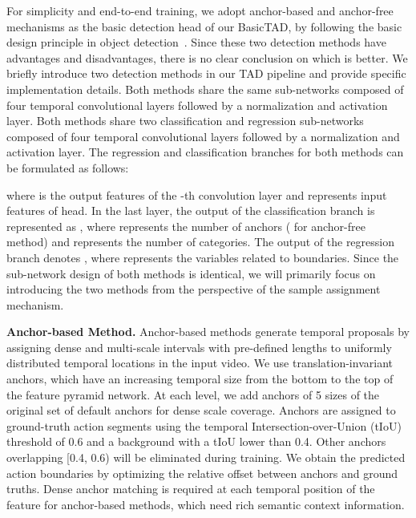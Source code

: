 \documentclass[a4paper,fleqn]{cas-dc}
\begin{document}
For simplicity and end-to-end training, we adopt anchor-based and anchor-free mechanisms as the basic detection head of our BasicTAD, by following the basic design principle in object detection~\citep{faster-rcnn,retina,fcos}.
Since these two detection methods have advantages and disadvantages, there is no clear conclusion on which is better. 
We briefly introduce two detection methods in our TAD pipeline and provide specific implementation details. Both methods share the same sub-networks composed of four temporal convolutional layers followed by a normalization and activation layer. Both methods share two classification and regression sub-networks composed of four temporal convolutional layers followed by a normalization and activation layer.
The regression and classification branches for both methods can be formulated as follows:

where  is the output features of the -th convolution layer and  represents input features of head. 
In the last layer, the output of the classification branch is represented as , where  represents the number of anchors ( for anchor-free method) and  represents the number of categories. The output of the regression branch denotes , where  represents the variables related to boundaries.
Since the sub-network design of both methods is identical, we will primarily focus on introducing the two methods from the perspective of the sample assignment mechanism.


\textbf{Anchor-based Method.}
Anchor-based methods generate temporal proposals by assigning dense and multi-scale intervals with pre-defined lengths to uniformly distributed temporal locations in the input video.
We use translation-invariant anchors, which have an increasing temporal size from the bottom to the top of the feature pyramid network.
At each level, we add anchors of 5 sizes 
 of the original set of default anchors for dense scale coverage.
Anchors are assigned to ground-truth action segments using the temporal Intersection-over-Union (tIoU) threshold of 0.6 and a background with a tIoU lower than 0.4.
Other anchors overlapping [0.4, 0.6) will be eliminated during training. We obtain the predicted action boundaries by optimizing the relative offset between anchors and ground truths. Dense anchor matching is required at each temporal position of the feature for anchor-based methods, which need rich semantic context information.
\end{document}
